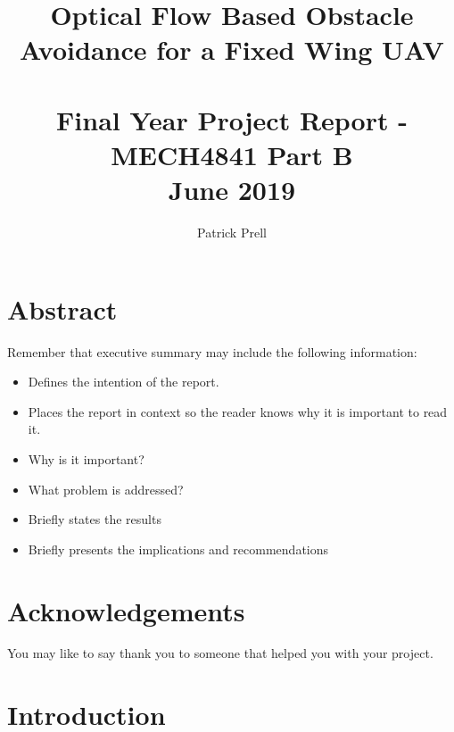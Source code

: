 \documentclass{UoNMCHA}
\numberwithin{equation}{section}
\begin{document}

\title{Optical Flow Based Obstacle Avoidance for a Fixed Wing UAV\\ \ \\
{\small Final Year Project Report - MECH4841 Part B  \\June 2019}}
\author[UoNMCHA]{Patrick Prell}
\address[UoNMCHA]{
Student of Mechatronics Engineering,\\
The University of Newcastle, Callaghan, NSW 2308, AUSTRALIA \\
Student Number: 3204734 \\
E-mail: \href{mailto:Patrick.Prell@uon.edu.au}{\textsf{Patrick.Prell@uon.edu.au}}}
\maketitle
\onecolumn

\vspace{-5mm}
\section*{Abstract}
\vspace{-3mm}
Remember that executive summary may include the following information:
\begin{itemize}
    \item Defines the intention of the report.
    \item Places the report in context so the reader knows why it is important to read it.
    \item Why is it important?
    \item What problem is addressed?
    \item Briefly states the results
    \item Briefly presents the implications and recommendations
\end{itemize}
\vspace{-2mm}
\section*{Acknowledgements}
\vspace{-3mm}
You may like to say thank you to someone that helped you with your project.
\newpage
\tableofcontents
\newpage
\section{Introduction}
\end{document}
